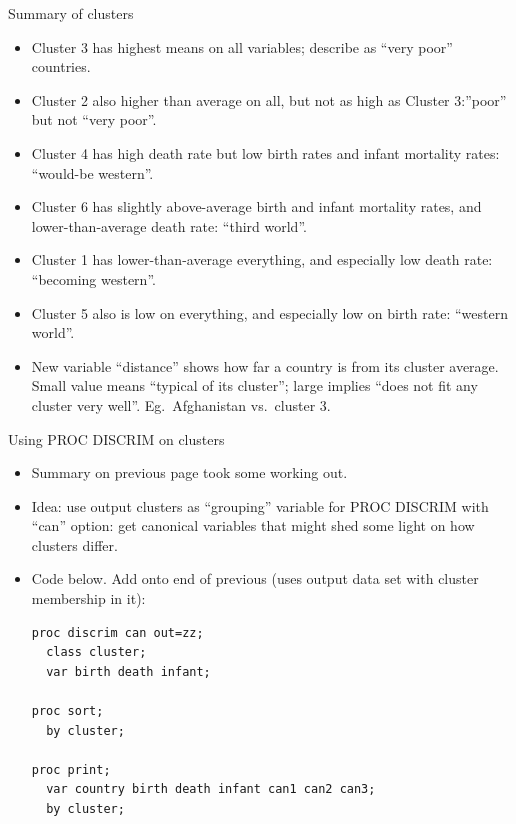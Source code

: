 \documentclass[pdf]{prosper}
\begin{document}
\begin{slide}{Summary of clusters}

  \begin{itemize}
  \item Cluster 3 has highest means on all variables; describe as ``very poor'' countries.
  \item Cluster 2 also higher than average on all, but not as high as Cluster 3:''poor'' but not ``very poor''.
  \item Cluster 4 has high death rate but low birth rates and infant mortality rates: ``would-be western''.
  \item Cluster 6 has slightly above-average birth and infant mortality rates, and lower-than-average death rate: ``third world''.
  \item Cluster 1 has lower-than-average everything, and especially low death rate: ``becoming western''.
  \item Cluster 5 also is low on everything, and especially low on birth rate: ``western world''.
  \item New variable ``distance'' shows how far a country is from its cluster average. Small value means ``typical of its cluster''; large implies ``does not fit any cluster very well''. Eg.\ Afghanistan vs.\ cluster 3.
  \end{itemize}
  
\end{slide}

\begin{slide}{Using PROC DISCRIM on clusters}

  \begin{itemize}
  \item Summary on previous page took some working out.
  \item Idea: use output clusters as ``grouping'' variable for PROC DISCRIM with ``can'' option: get canonical variables that might shed some light on how clusters differ.
  \item Code below. Add onto end of previous (uses output data set with cluster membership in it):
\begin{verbatim}
proc discrim can out=zz;
  class cluster;
  var birth death infant;

proc sort;
  by cluster;

proc print;
  var country birth death infant can1 can2 can3;
  by cluster;

\end{verbatim}
  \end{itemize}
  
\end{slide}
\end{document}
